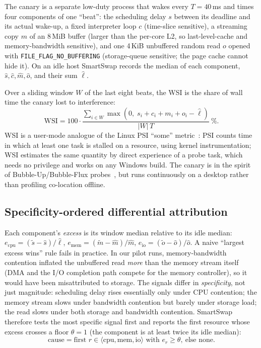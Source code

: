 The canary is a separate low-duty process that wakes every $T=40$\,ms and times four components of one ``beat'': the scheduling delay $s$ between its deadline and its actual wake-up, a fixed interpreter loop $c$ (time-slice sensitive), a streaming copy $m$ of an 8\,MiB buffer (larger than the per-core L2, so last-level-cache and memory-bandwidth sensitive), and one 4\,KiB unbuffered random read $o$ opened with \texttt{FILE\_FLAG\_NO\_BUFFERING} (storage-queue sensitive; the page cache cannot hide it). On an idle host SmartSwap records the median of each component, $\hat{s},\hat{c},\hat{m},\hat{o}$, and their sum $\hat{\ell}$.

Over a sliding window $W$ of the last eight beats, the WSI is the share of wall time the canary lost to interference:
\begin{equation}
\mathrm{WSI} = 100\cdot\frac{\sum_{i\in W}\max\!\left(0,\; s_i+c_i+m_i+o_i-\hat{\ell}\right)}{|W|\,T}\ \%.
\label{eq:wsi}
\end{equation}
WSI is a user-mode analogue of the Linux PSI ``some'' metric~\cite{weiner2018psi}: PSI counts time in which at least one task is stalled on a resource, using kernel instrumentation; WSI estimates the same quantity by direct experience of a probe task, which needs no privilege and works on any Windows build. The canary is in the spirit of Bubble-Up/Bubble-Flux probes~\cite{mars2011bubbleup,yang2013bubbleflux}, but runs continuously on a desktop rather than profiling co-location offline.

\subsection{Specificity-ordered differential attribution}

Each component's \emph{excess} is its window median relative to its idle median: $e_\mathrm{cpu}=(\tilde{s}-\hat{s})/\hat{\ell}$, $e_\mathrm{mem}=(\tilde{m}-\hat{m})/\hat{m}$, $e_\mathrm{io}=(\tilde{o}-\hat{o})/\hat{o}$. A naive ``largest excess wins'' rule fails in practice. In our pilot runs, memory-bandwidth contention inflated the unbuffered read \emph{more} than the memory stream itself (DMA and the I/O completion path compete for the memory controller), so it would have been misattributed to storage. The signals differ in \emph{specificity}, not just magnitude: scheduling delay rises essentially only under CPU contention; the memory stream slows under bandwidth contention but barely under storage load; the read slows under both storage and bandwidth contention. SmartSwap therefore tests the most specific signal first and reports the first resource whose excess crosses a floor $\theta=1$ (the component is at least twice its idle median):
\begin{equation}
\mathrm{cause} = \text{first } r\in\langle\mathrm{cpu},\mathrm{mem},\mathrm{io}\rangle \text{ with } e_r\ge\theta,\ \text{else } \mathrm{none}.
\end{equation}

